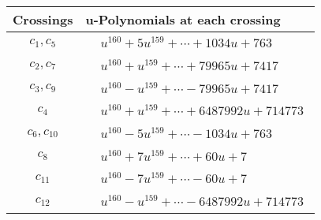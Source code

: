 \documentclass[1p]{elsarticle_modified}
\theoremstyle{definition}
\begin{document}
\begin{tabular}{m{50pt}|m{274pt}}
Crossings & \hspace{64pt}u-Polynomials at each crossing \\
\hline $$\begin{aligned}c_{1},c_{5}\end{aligned}$$&$\begin{aligned}
&u^{160}+5 u^{159}+\cdots+1034 u+763
\end{aligned}$\\
\hline $$\begin{aligned}c_{2},c_{7}\end{aligned}$$&$\begin{aligned}
&u^{160}+u^{159}+\cdots+79965 u+7417
\end{aligned}$\\
\hline $$\begin{aligned}c_{3},c_{9}\end{aligned}$$&$\begin{aligned}
&u^{160}- u^{159}+\cdots-79965 u+7417
\end{aligned}$\\
\hline $$\begin{aligned}c_{4}\end{aligned}$$&$\begin{aligned}
&u^{160}+u^{159}+\cdots+6487992 u+714773
\end{aligned}$\\
\hline $$\begin{aligned}c_{6},c_{10}\end{aligned}$$&$\begin{aligned}
&u^{160}-5 u^{159}+\cdots-1034 u+763
\end{aligned}$\\
\hline $$\begin{aligned}c_{8}\end{aligned}$$&$\begin{aligned}
&u^{160}+7 u^{159}+\cdots+60 u+7
\end{aligned}$\\
\hline $$\begin{aligned}c_{11}\end{aligned}$$&$\begin{aligned}
&u^{160}-7 u^{159}+\cdots-60 u+7
\end{aligned}$\\
\hline $$\begin{aligned}c_{12}\end{aligned}$$&$\begin{aligned}
&u^{160}- u^{159}+\cdots-6487992 u+714773
\end{aligned}$\\
\hline
\end{tabular}\\~\\
\end{document}
